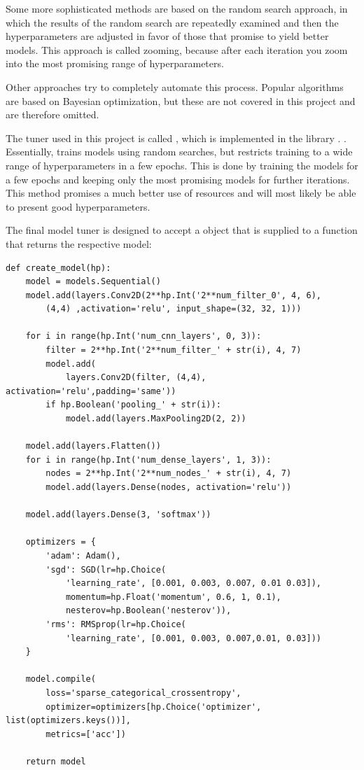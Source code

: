 Some more sophisticated methods are based on the random search approach, in which the results of the random search are repeatedly examined and then the hyperparameters are adjusted in favor of those that promise to yield better models.
This approach is called zooming, because after each iteration you zoom into the most promising range of hyperparameters.

Other approaches try to completely automate this process.
Popular algorithms are based on Bayesian optimization, but these are not covered in this project and are therefore omitted.

The tuner used in this project is called  \cite{Li2018}, which is implemented in the library . \cite{Google2019a}.
Essentially,  trains models using random searches, but restricts training to a wide range of hyperparameters in a few epochs.
This is done by training the models for a few epochs and keeping only the most promising models for further iterations.
This method promises a much better use of resources and will most likely be able to present good hyperparameters.

The final model tuner is designed to accept a  object that is supplied to a function that returns the respective model:

\begin{lstlisting}
def create_model(hp):
    model = models.Sequential()
    model.add(layers.Conv2D(2**hp.Int('2**num_filter_0', 4, 6),
        (4,4) ,activation='relu', input_shape=(32, 32, 1)))

    for i in range(hp.Int('num_cnn_layers', 0, 3)):
        filter = 2**hp.Int('2**num_filter_' + str(i), 4, 7)
        model.add(
            layers.Conv2D(filter, (4,4), activation='relu',padding='same'))
        if hp.Boolean('pooling_' + str(i)):
            model.add(layers.MaxPooling2D(2, 2))

    model.add(layers.Flatten())
    for i in range(hp.Int('num_dense_layers', 1, 3)):
        nodes = 2**hp.Int('2**num_nodes_' + str(i), 4, 7)
        model.add(layers.Dense(nodes, activation='relu'))
    
    model.add(layers.Dense(3, 'softmax'))

    optimizers = {
        'adam': Adam(),
        'sgd': SGD(lr=hp.Choice(
            'learning_rate', [0.001, 0.003, 0.007, 0.01 0.03]),
            momentum=hp.Float('momentum', 0.6, 1, 0.1),
            nesterov=hp.Boolean('nesterov')),
        'rms': RMSprop(lr=hp.Choice(
            'learning_rate', [0.001, 0.003, 0.007,0.01, 0.03]))
    }

    model.compile(
        loss='sparse_categorical_crossentropy',
        optimizer=optimizers[hp.Choice('optimizer', list(optimizers.keys())],
        metrics=['acc'])

    return model
\end{lstlisting}

